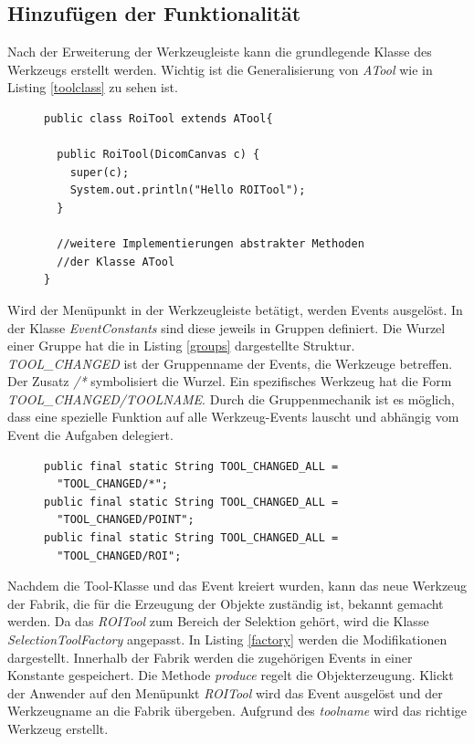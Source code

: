 \subsection{Hinzufügen der Funktionalität}

Nach der Erweiterung der Werkzeugleiste kann die grundlegende Klasse des Werkzeugs erstellt werden. Wichtig ist die Generalisierung von \textit{ATool} wie in Listing \ref{toolclass} zu sehen ist.

\begin{figure}[htbp]
\begin{lstlisting}[frame=leftline]
public class RoiTool extends ATool{

  public RoiTool(DicomCanvas c) {
    super(c);
    System.out.println("Hello ROITool");
  }
  
  //weitere Implementierungen abstrakter Methoden
  //der Klasse ATool
}
\end{lstlisting}
\end{figure}

Wird der Menüpunkt in der Werkzeugleiste betätigt, werden Events ausgelöst. In der Klasse \textit{EventConstants} sind diese jeweils in Gruppen definiert. Die Wurzel einer Gruppe hat die in Listing \ref{groups} dargestellte Struktur. \textit{TOOL\_CHANGED} ist der Gruppenname der Events, die Werkzeuge betreffen. Der Zusatz \textit{/*} symbolisiert die Wurzel. Ein spezifisches Werkzeug hat die Form \textit{TOOL\_CHANGED/TOOLNAME}. Durch die Gruppenmechanik ist es möglich, dass eine spezielle Funktion auf alle Werkzeug-Events lauscht und abhängig vom Event die Aufgaben delegiert.

\begin{figure}[htbp]
\begin{lstlisting}[frame=leftline]
public final static String TOOL_CHANGED_ALL = 
  "TOOL_CHANGED/*";
public final static String TOOL_CHANGED_ALL = 
  "TOOL_CHANGED/POINT";
public final static String TOOL_CHANGED_ALL = 
  "TOOL_CHANGED/ROI";
\end{lstlisting}
\end{figure}

Nachdem die Tool-Klasse und das Event kreiert wurden, kann das neue Werkzeug der Fabrik, die für die Erzeugung der Objekte zuständig ist, bekannt gemacht werden. Da das \textit{ROITool} zum Bereich der Selektion gehört, wird die Klasse \textit{SelectionToolFactory} angepasst. In Listing \ref{factory} werden die Modifikationen dargestellt. Innerhalb der Fabrik werden die zugehörigen Events in einer Konstante gespeichert. Die Methode \textit{produce} regelt die Objekterzeugung. Klickt der Anwender auf den Menüpunkt \textit{ROITool} wird das Event ausgelöst und der Werkzeugname an die Fabrik übergeben. Aufgrund des \textit{toolname} wird das richtige Werkzeug erstellt.

